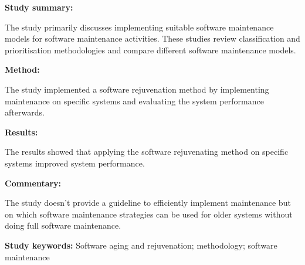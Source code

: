 \begin{tcolorbox}[colback=gray!5!white, colframe=pastelgreen!40!black, title=A Software Maintenance Methodology: An Approach Applied to Software Aging\cite{Araujo2021}]
	\begin{minipage}[t]{0.25\textwidth}
		\textbf{Study summary:}
	\end{minipage}
	\hfill
	\begin{minipage}[t]{0.65\textwidth}
		The study primarily discusses implementing suitable software maintenance models for software
		maintenance activities. These studies review classification and prioritisation methodologies
		and compare different software maintenance models.
	\end{minipage}

	\vspace{0.75em} 

	\begin{minipage}[t]{0.25\textwidth}
		\textbf{Method:}
	\end{minipage}
	\hfill
	\begin{minipage}[t]{0.65\textwidth}
		The study implemented a software rejuvenation method by implementing maintenance on specific systems and evaluating the system performance afterwards.
	\end{minipage}

	\vspace{0.75em} 

	\begin{minipage}[t]{0.25\textwidth}
		\textbf{Results:}
	\end{minipage}
	\hfill
	\begin{minipage}[t]{0.65\textwidth}
		The results showed that applying the software rejuvenating method on specific systems improved system performance.
	\end{minipage}

	\vspace{0.75em} 

	\begin{minipage}[t]{0.25\textwidth}
		\textbf{Commentary:}
	\end{minipage}
	\hfill
	\begin{minipage}[t]{0.65\textwidth}
		The study doesn't provide a guideline to efficiently implement maintenance but on which
		software maintenance strategies can be used for older systems without doing full software maintenance.
	\end{minipage}
	\tcblower
	\textbf{Study keywords:} Software aging and rejuvenation; methodology; software maintenance
\end{tcolorbox}

